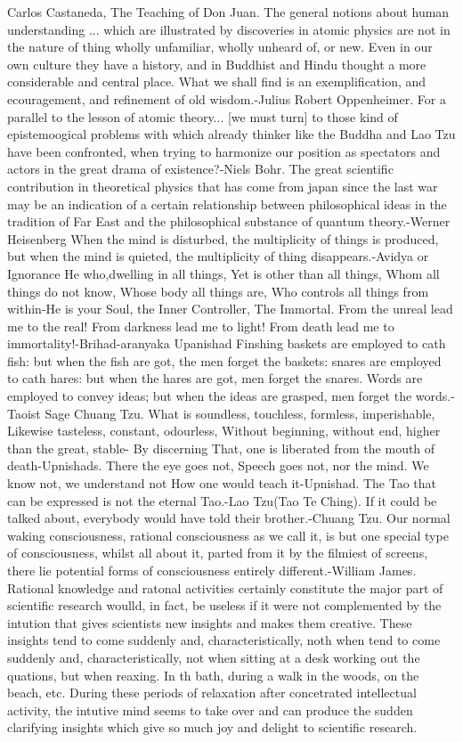 Carlos Castaneda, The Teaching of Don Juan.
The general notions about human understanding ... which are illustrated by discoveries in atomic physics are not in the nature of thing wholly unfamiliar, wholly unheard of, or new. Even in our own culture they have a history, and in Buddhist and Hindu thought a more considerable and central place. What we shall find is an exemplification, and ecouragement, and refinement of old wisdom.-Julius Robert Oppenheimer.
For a parallel to the lesson of atomic theory... [we must turn] to those kind of epistemoogical problems with which already thinker like the Buddha and Lao Tzu have been confronted, when trying to harmonize our position as spectators and actors in the great drama of existence?-Niels Bohr.
The great scientific contribution in theoretical physics that has come from japan since the last war may be an indication of a certain relationship between philosophical ideas in the tradition of Far East and the philosophical substance of quantum theory.-Werner Heisenberg
When the mind is disturbed, the multiplicity of things is produced, but when the mind is quieted, the multiplicity of thing disappears.-Avidya or Ignorance
He who,dwelling in all things, Yet is other than all things, Whom all things do not know, Whose body all things are, Who controls all things from within-He is your Soul, the Inner Controller, The Immortal.
From the unreal lead me to the real! From darkness lead me to light! From death lead me to immortality!-Brihad-aranyaka Upanishad
Finshing baskets are employed to cath fish: but when the fish are got, the men forget the baskets: snares are employed to cath hares: but when the hares are got, men forget the snares. Words are employed to convey ideas; but when the ideas are grasped, men forget the words.-Taoist Sage Chuang Tzu.
What is soundless, touchless, formless, imperishable, Likewise tasteless, constant, odourless, Without beginning, without end, higher than the great, stable- By discerning That, one is liberated from the mouth of death-Upnishads.
There the eye goes not, Speech goes not, nor the mind. We know not, we understand not How one would teach it-Upnishad.
The Tao that can be expressed is not the eternal Tao.-Lao Tzu(Tao Te Ching).
If it could be talked about, everybody would have told their brother.-Chuang Tzu.
Our normal waking consciousness, rational consciousness as we call it, is but one special type of consciousness, whilst all about it, parted from it by the filmiest of screens, there lie potential forms of consciousness entirely different.-William James.
Rational knowledge and ratonal activities certainly constitute the major part of scientific research woulld, in fact, be useless if it were not complemented by the intution that gives scientists new insights and makes them creative. These insights tend to come suddenly and, characteristically, noth when tend to come suddenly and, characteristically, not when sitting at a desk working out the quations, but when reaxing. In th bath, during a walk in the woods, on the beach, etc. During these periods of relaxation after concetrated intellectual activity, the intutive mind seems to take over and can produce the sudden clarifying insights which give so much joy and delight to scientific research.
